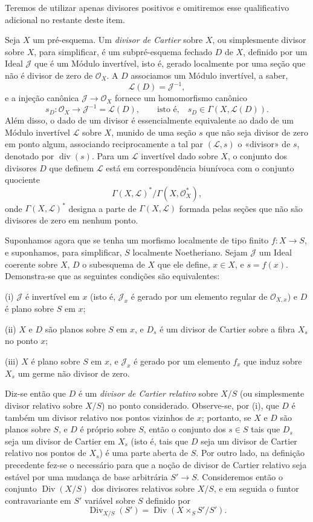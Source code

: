 Teremos de utilizar apenas divisores positivos e omitiremos esse qualificativo
adicional no restante deste item.

Seja $X$ um pré-esquema. Um \emph{divisor de Cartier} sobre $X$, ou simplesmente
divisor sobre $X$, para simplificar, é um subpré-esquema fechado $D$ de $X$,
definido por um Ideal $\mathcal J$ que é um Módulo invertível, isto é, gerado
localmente por uma seção que não é divisor de zero de $\mathcal O_X$. A $D$
associamos um Módulo invertível, a saber,
\[
\mathcal L(D)=\mathcal J^{-1},
\]
e a injeção canônica $\mathcal J\longrightarrow\mathcal O_X$ fornece um
homomorfismo canônico
\[
s_D:\mathcal O_X\longrightarrow\mathcal J^{-1}=\mathcal L(D),
\qquad\text{isto é,}\quad s_D\in\Gamma(X,\mathcal L(D)).
\]
Além disso, o dado de um divisor é essencialmente equivalente ao dado de um
Módulo invertível $\mathcal L$ sobre $X$, munido de uma seção $s$ que não seja
divisor de zero em ponto algum, associando reciprocamente a tal par
$(\mathcal L,s)$ o «divisor» de $s$, denotado por $\operatorname{div}(s)$. Para
um $\mathcal L$ invertível dado sobre $X$, o conjunto dos
divisores $D$ que definem $\mathcal L$ está em correspondência biunívoca com o
conjunto quociente
\[
\Gamma(X,\mathcal L)^*/\Gamma(X,\mathcal O_X^*),
\]
onde $\Gamma(X,\mathcal L)^*$ designa a parte de $\Gamma(X,\mathcal L)$ formada
pelas seções que não são divisores de zero em nenhum ponto.

Suponhamos agora que se tenha um morfismo localmente de tipo finito
$f:X\longrightarrow S$, e suponhamos, para simplificar, $S$ localmente
Noetheriano. Sejam $\mathcal J$ um Ideal coerente sobre $X$, $D$ o subesquema de
$X$ que ele define, $x\in X$, e $s=f(x)$. Demonstra-se que as seguintes
condições são equivalentes:

\noindent (i) $\mathcal J$ é invertível em $x$ (isto é, $\mathcal J_x$ é gerado
por um elemento regular de $\mathcal O_{X,x}$) e $D$ é plano sobre $S$ em $x$;

\noindent (ii) $X$ e $D$ são planos sobre $S$ em $x$, e $D_s$ é um divisor de
Cartier sobre a fibra $X_s$ no ponto $x$;

\noindent (iii) $X$ é plano sobre $S$ em $x$, e $\mathcal J_x$ é gerado por um
elemento $f_x$ que induz sobre $X_s$ um germe não divisor de zero.

Diz-se então que $D$ é um \emph{divisor de Cartier relativo} sobre $X/S$ (ou
simplesmente divisor relativo sobre $X/S$) no ponto considerado. Observe-se, por
(i), que $D$ é também um divisor relativo nos pontos vizinhos de $x$; portanto,
se $X$ e $D$ são planos sobre $S$, e $D$ é próprio sobre $S$, então o conjunto
dos $s\in S$ tais que $D_s$ seja um divisor de Cartier em $X_s$ (isto é, tais
que $D$ seja um divisor de Cartier relativo nos pontos de $X_s$) é uma parte
aberta de $S$. Por outro lado, na definição precedente fez-se o necessário para
que a noção de divisor de Cartier relativo seja estável por uma mudança de base
arbitrária $S'\longrightarrow S$. Consideremos então o conjunto
$\operatorname{Div}(X/S)$ dos divisores relativos sobre $X/S$, e em seguida o
funtor contravariante em $S'$ variável sobre $S$ definido por
\[
\operatorname{Div}_{X/S}(S')=
\operatorname{Div}(X\times_SS'/S').
\]

